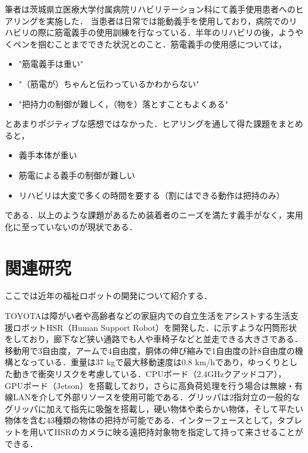 筆者は茨城県立医療大学付属病院リハビリテーション科にて義手使用患者へのヒアリングを実施した．
当患者は日常では能動義手を使用しており，病院でのリハビリの際に筋電義手の使用訓練を行なっている．半年のリハビリの後，ようやくペンを掴むことまでできた状況とのこと．筋電義手の使用感については，
\begin{itemize}
    \item "筋電義手は重い"
    \item "（筋電が）ちゃんと伝わっているかわからない"
    \item "把持力の制御が難しく，（物を）落とすこともよくある"
\end{itemize}
とあまりポジティブな感想ではなかった．ヒアリングを通して得た課題をまとめると，
\begin{itemize}
    \item 義手本体が重い
    \item 筋電による義手の制御が難しい
    \item リハビリは大変で多くの時間を要する（割にはできる動作は把持のみ）
\end{itemize}
である．以上のような課題があるため装着者のニーズを満たす義手がなく，実用化に至っていないのが現状である．


\section{関連研究}
ここでは近年の福祉ロボットの開発について紹介する．

TOYOTAは障がい者や高齢者などの家庭内での自立生活をアシストする生活支援ロボットHSR（Human Support Robot）を開発した\cite{HSR2019}．に示すような円筒形状をしており，廊下など狭い通路でも人や車椅子などと並走できる大きさである．移動用で3自由度，アームで4自由度，胴体の伸び縮みで1自由度の計8自由度の機構となっている．重量は37 kgで最大移動速度は0.8 km/hであり，ゆっくりとした動きで衝突リスクを考慮している．CPUボード（2.4GHzクアッドコア），GPUボード（Jetson）を搭載しており，さらに高負荷処理を行う場合は無線・有線LANを介して外部リソースを使用可能である．グリッパは2指対立の一般的なグリッパに加えて指先に吸盤を搭載し，硬い物体や柔らかい物体，そして平たい物体を含む43種類の物体の把持が可能である．インターフェースとして，タブレットを用いてHSRのカメラに映る遠把持対象物を指定して持って来させることができる．


